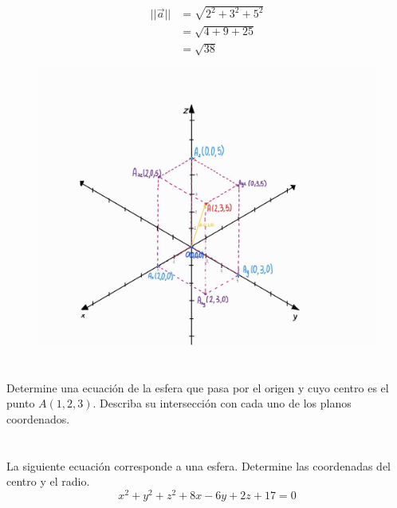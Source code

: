 \documentclass[12pt]{article}
\begin{document}
\begin{itemize}
\begin{equation*}
  \begin{split}
    ||\vec{a}|| &= \sqrt{2^2 +  3^2 + 5^2} \\
    &= \sqrt{4 +  9 + 25} \\
    &= \sqrt{38}
 \end{split}
\end{equation*}
\begin{figure}[H]
       \centering
       \includegraphics[width=1\textwidth]{./img/diagonal.jpeg}
  \end{figure}
\end{itemize}
\section{}

Determine una ecuación de la esfera que pasa por el origen y cuyo centro es el punto $A(1,2,3)$. Describa su intersección con cada uno de los planos coordenados.

\section{}

La siguiente ecuación corresponde a una esfera. Determine las coordenadas del centro y el radio.
\[ x^2 + y^2 + z^2 + 8x - 6y + 2z + 17 = 0 \]
\end{document}
